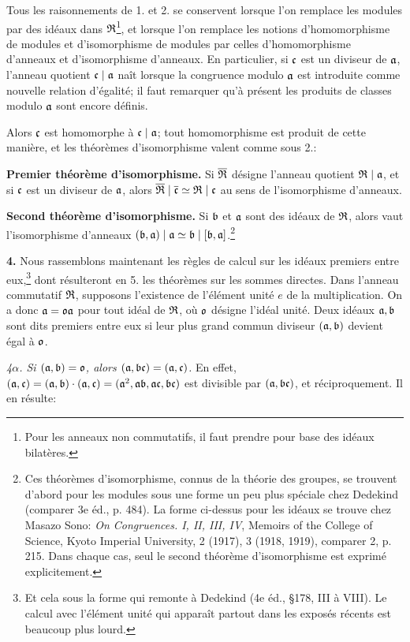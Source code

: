 Tous les raisonnements de 1. et 2. se conservent lorsque l'on remplace les modules par des idéaux dans $\mathfrak{R}$\footnote{Pour les anneaux non commutatifs, il faut prendre pour base des idéaux bilatères.}, et lorsque l'on remplace les notions d'homomorphisme de modules et d'isomorphisme de modules par celles d'homomorphisme d'anneaux et d'isomorphisme d'anneaux. En particulier, si $\mathfrak{c}$ est un diviseur de $\mathfrak{a}$, l'anneau quotient $\mathfrak{c}\mid\mathfrak{a}$ naît lorsque la congruence modulo $\mathfrak{a}$ est introduite comme nouvelle relation d'égalité; il faut remarquer qu'à présent les produits de classes modulo $\mathfrak{a}$ sont encore définis.

Alors $\mathfrak{c}$ est homomorphe à $\mathfrak{c}\mid\mathfrak{a}$; tout homomorphisme est produit de cette manière, et les théorèmes d'isomorphisme valent comme sous 2.:

\textbf{Premier théorème d'isomorphisme.} Si $\overline{\mathfrak{R}}$ désigne l'anneau quotient $\mathfrak{R}\mid\mathfrak{a}$, et si $\mathfrak{c}$ est un diviseur de $\mathfrak{a}$, alors $\overline{\mathfrak{R}}\mid\overline{\mathfrak{c}}\simeq\mathfrak{R}\mid\mathfrak{c}$ au sens de l'isomorphisme d'anneaux.

\textbf{Second théorème d'isomorphisme.} Si $\mathfrak{b}$ et $\mathfrak{a}$ sont des idéaux de $\mathfrak{R}$, alors vaut l'isomorphisme d'anneaux $(\mathfrak{b},\mathfrak{a})\mid\mathfrak{a}\simeq\mathfrak{b}\mid[\mathfrak{b},\mathfrak{a}]$.\footnote{Ces théorèmes d'isomorphisme, connus de la théorie des groupes, se trouvent d'abord pour les modules sous une forme un peu plus spéciale chez Dedekind (comparer 3e éd., p. 484). La forme ci-dessus pour les idéaux se trouve chez Masazo Sono: \emph{On Congruences. I, II, III, IV}, Memoirs of the College of Science, Kyoto Imperial University, 2 (1917), 3 (1918, 1919), comparer 2, p. 215. Dans chaque cas, seul le second théorème d'isomorphisme est exprimé explicitement.}

\textbf{4.} Nous rassemblons maintenant les règles de calcul sur les idéaux premiers entre eux,\footnote{Et cela sous la forme qui remonte à Dedekind (4e éd., \S{}178, III à VIII). Le calcul avec l'élément unité qui apparaît partout dans les exposés récents est beaucoup plus lourd.} dont résulteront en 5. les théorèmes sur les sommes directes. Dans l'anneau commutatif $\mathfrak{R}$, supposons l'existence de l'élément unité $e$ de la multiplication. On a donc $\mathfrak{a}=\mathfrak{o}\mathfrak{a}$ pour tout idéal de $\mathfrak{R}$, où $\mathfrak{o}$ désigne l'idéal unité. Deux idéaux $\mathfrak{a},\mathfrak{b}$ sont dits premiers entre eux si leur plus grand commun diviseur $(\mathfrak{a},\mathfrak{b})$ devient égal à $\mathfrak{o}$.

\emph{4$\alpha$. Si $(\mathfrak{a},\mathfrak{b})=\mathfrak{o}$, alors $(\mathfrak{a},\mathfrak{b}\mathfrak{c})=(\mathfrak{a},\mathfrak{c})$.} En effet, $(\mathfrak{a},\mathfrak{c})=(\mathfrak{a},\mathfrak{b})\cdot(\mathfrak{a},\mathfrak{c})=(\mathfrak{a}^2,\mathfrak{a}\mathfrak{b},\mathfrak{a}\mathfrak{c},\mathfrak{b}\mathfrak{c})$ est divisible par $(\mathfrak{a},\mathfrak{b}\mathfrak{c})$, et réciproquement. Il en résulte:

